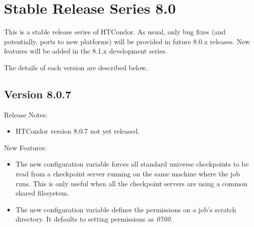 
\section{\label{sec:History-8-0}Stable Release Series 8.0}

This is a stable release series of HTCondor.
As usual, only bug fixes (and potentially, ports to new platforms)
will be provided in future 8.0.x releases.
New features will be added in the 8.1.x development series.

The details of each version are described below.

\subsection*{\label{sec:New-8-0-7}Version 8.0.7}

\noindent Release Notes:

\begin{itemize}

\item HTCondor version 8.0.7 not yet released.

\end{itemize}


\noindent New Features:

\begin{itemize}

\item The new configuration variable 
forces all standard universe checkpoints to be read from a checkpoint
server running on the same machine where the job runs.  This is only useful
when all the checkpoint servers are using a common shared filesystem.

\item The new configuration variable 
defines the permissions on a job's scratch directory. 
It defaults to setting permissions as \emph{0700}.


\end{itemize}

